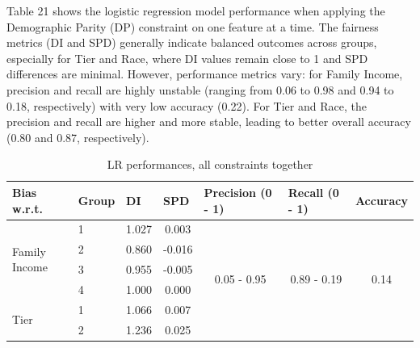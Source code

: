\documentclass{article}
\begin{document}
Table 21 shows the logistic regression model performance when applying the Demographic Parity (DP) constraint on one feature at a time. The fairness metrics (DI and SPD) generally indicate balanced outcomes across groups, especially for Tier and Race, where DI values remain close to 1 and SPD differences are minimal. However, performance metrics vary: for Family Income, precision and recall are highly unstable (ranging from 0.06 to 0.98 and 0.94 to 0.18, respectively) with very low accuracy (0.22). For Tier and Race, the precision and recall are higher and more stable, leading to better overall accuracy (0.80 and 0.87, respectively).


\begin{table}[H]
\caption{LR performances, all constraints together}
\begin{tabular}{llcc|ccc}
\hline
\textbf{Bias w.r.t.}                   &  \textbf{Group} & \multicolumn{1}{l}{ \textbf{DI} } & \multicolumn{1}{l}{ \textbf{SPD}}    & \multicolumn{1}{l}{ \textbf{Precision (0 - 1)}} & \multicolumn{1}{l}{\textbf{Recall (0 - 1)}} & \multicolumn{1}{l}{\textbf{Accuracy}} \\
\hline
\multirow{4}{*}{Family Income} & 1     & 1.027                  & 0.003                      & \multirow{13}{*}{0.05 - 0.95}         & \multirow{13}{*}{0.89 - 0.19}      & \multirow{13}{*}{0.14}       \\
                               & 2     & 0.860                  & -0.016                     &                                       &                                    &                              \\
                               & 3     & 0.955                  & -0.005                     &                                       &                                    &                              \\
                               & 4     & 1.000                  & 0.000                      &                                       &                                    &                              \\
\cline{1-4}
\multirow{5}{*}{Tier}          & 1     & 1.066                  & 0.007                      &                                       &                                    &                              \\
                               & 2     & 1.236                  & 0.025                      &                                       &                                    &                              \\

\end{tabular}
\end{table}
\end{document}
